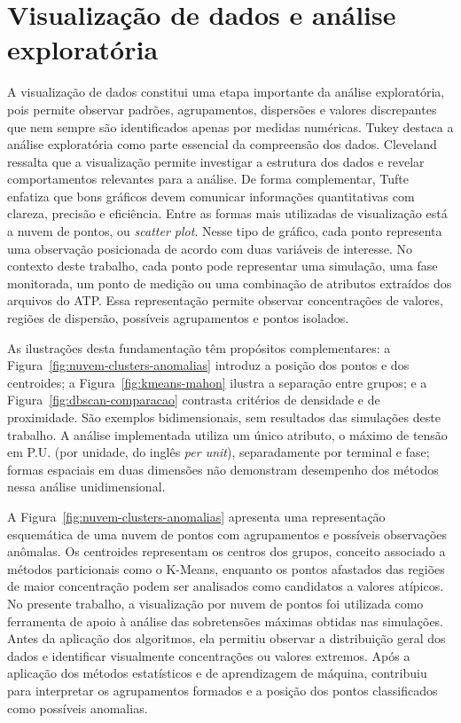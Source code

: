 \documentclass[
	12pt,				%
	openright,			%
	oneside,			%
	a4paper,			%
	chapter=TITLE,		%
	section=TITLE,		%
	subsection=TITLE,	%
	subsubsection=TITLE,%
	english,			%
	brazilian			%
	]{abntex2}
\theoremstyle{definition}
\begin{document}
\section{Visualização de dados e análise exploratória}

A visualização de dados constitui uma etapa importante da análise exploratória, pois permite observar padrões, agrupamentos, dispersões e valores discrepantes que nem sempre são identificados apenas por medidas numéricas. Tukey \cite{tukey1977} destaca a análise exploratória como parte essencial da compreensão dos dados. Cleveland \cite{cleveland1993} ressalta que a visualização permite investigar a estrutura dos dados e revelar comportamentos relevantes para a análise. De forma complementar, Tufte \cite{tufte2001} enfatiza que bons gráficos devem comunicar informações quantitativas com clareza, precisão e eficiência. Entre as formas mais utilizadas de visualização está a nuvem de pontos, ou \textit{scatter plot}. Nesse tipo de gráfico, cada ponto representa uma observação posicionada de acordo com duas variáveis de interesse. No contexto deste trabalho, cada ponto pode representar uma simulação, uma fase monitorada, um ponto de medição ou uma combinação de atributos extraídos dos arquivos do ATP. Essa representação permite observar concentrações de valores, regiões de dispersão, possíveis agrupamentos e pontos isolados.

As ilustrações desta fundamentação têm propósitos complementares: a
Figura~\ref{fig:nuvem-clusters-anomalias} introduz a posição dos pontos e dos
centroides; a Figura~\ref{fig:kmeans-mahon} ilustra a separação entre grupos;
e a Figura~\ref{fig:dbscan-comparacao} contrasta critérios de densidade e de
proximidade. São exemplos bidimensionais, sem resultados das simulações deste
trabalho. A análise implementada utiliza um único atributo, o máximo de tensão
em P.U. (por unidade, do inglês \textit{per unit}), separadamente por terminal e fase; formas espaciais em duas dimensões
não demonstram desempenho dos métodos nessa análise unidimensional.

A Figura~\ref{fig:nuvem-clusters-anomalias} apresenta uma representação esquemática de uma nuvem de pontos com agrupamentos e possíveis observações anômalas. Os centroides representam os centros dos grupos, conceito associado a métodos particionais como o K-Means, enquanto os pontos afastados das regiões de maior concentração podem ser analisados como candidatos a valores atípicos.
No presente trabalho, a visualização por nuvem de pontos foi utilizada como ferramenta de apoio à análise das sobretensões máximas obtidas nas simulações. Antes da aplicação dos algoritmos, ela permitiu observar a distribuição geral dos dados e identificar visualmente concentrações ou valores extremos. Após a aplicação dos métodos estatísticos e de aprendizagem de máquina, contribuiu para interpretar os agrupamentos formados e a posição dos pontos classificados como possíveis anomalias.
\end{document}
